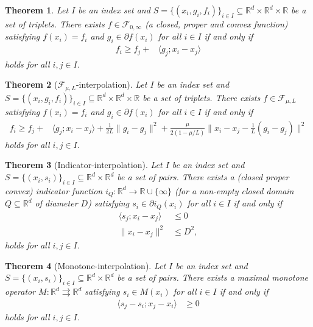 \documentclass[11pt,a4paper]{article}
\newtheorem{theorem}{Theorem}
\begin{document}
	\begin{theorem}Let $I$ be an index set and $S=\{(x_i,g_i,f_i)\}_{i\in I}\subseteq \mathbb{R}^d\times\mathbb{R}^d\times \mathbb{R}$ be a set of triplets. There exists $f\in\mathcal{F}_{0,\infty}$ (a closed, proper and convex function) satisfying $f(x_i)=f_i$ and $g_i\in\partial f(x_i)$ for all $i\in I$ if and only if
\begin{equation*}
\begin{aligned}
f_i\geqslant f_j+&\langle g_j;x_i-x_j\rangle
\end{aligned}
\end{equation*}
holds for all $i,j\in I$.
	\end{theorem}
	
	\begin{theorem}[$\mathcal{F}_{\mu,L}$-interpolation]\label{thm:interp_smoothstronglyconvex} Let $I$ be an index set and $S=\{(x_i,g_i,f_i)\}_{i\in I}\subseteq \mathbb{R}^d\times\mathbb{R}^d\times \mathbb{R}$ be a set of triplets. There exists $f\in\mathcal{F}_{\mu,L}$ satisfying $f(x_i)=f_i$ and $g_i\in\partial f(x_i)$ for all $i\in I$ if and only if
\begin{equation*}
\begin{aligned}
f_i\geqslant f_j+&\langle g_j;x_i-x_j\rangle+\frac{1}{2L}\|g_i-g_j\|^2+\frac{\mu}{2(1-\mu/L)}\|x_i-x_j-\tfrac{1}{L}(g_i-g_j)\|^2
\end{aligned}
\end{equation*}
holds for all $i,j\in I$.
\end{theorem}

\begin{theorem}[Indicator-interpolation]\label{thm:interp_indicator} Let $I$ be an index set and $S=\{(x_i,s_i)\}_{i\in I}\subseteq \mathbb{R}^d\times\mathbb{R}^d$ be a set of pairs. There exists a (closed proper convex) indicator function $i_Q:\mathbb{R}^d\rightarrow\mathbb{R}\cup\{\infty\}$ (for a non-empty closed domain $Q\subseteq\mathbb{R}^d$ of diameter $D$) satisfying  $s_i\in\partial i_Q(x_i)$ for all $i\in I$ if and only if
\begin{equation*}
\begin{aligned}
\langle s_j;x_i-x_j\rangle&\leqslant 0\\
 \|x_i-x_j\|^2 &\leqslant D^2,
\end{aligned}
\end{equation*}
holds for all $i,j\in I$.
\end{theorem}

\begin{theorem}[Monotone-interpolation]\label{thm:monotone_interpolation} Let $I$ be an index set and $S=\{(x_i,s_i)\}_{i\in I}\subseteq \mathbb{R}^d\times\mathbb{R}^d$ be a set of pairs. There exists a maximal monotone operator $M:\mathbb{R}^d\rightrightarrows\mathbb{R}^d$ satisfying $s_i\in M(x_i)$ for all $i\in I$ if and only if
\begin{equation*}
\begin{aligned}
\langle s_j-s_i;x_j-x_i\rangle&\geqslant 0
\end{aligned}
\end{equation*}
holds for all $i,j\in I$.
\end{theorem}
\end{document}
